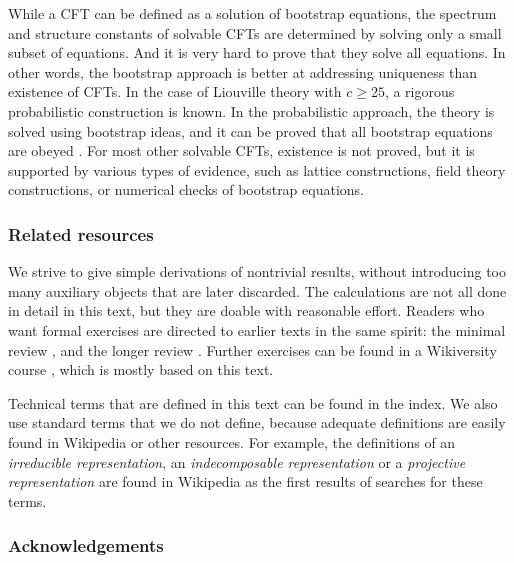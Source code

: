 \documentclass[12pt, a4paper]{article}
\begin{document}
While a CFT can be defined as a solution of bootstrap equations, the spectrum and structure constants of solvable CFTs are determined by solving only a small subset of equations. And it is very hard to prove that they solve all equations. In other words, the bootstrap approach is better at addressing uniqueness than existence of CFTs. In the case of Liouville theory with $c\geq 25$, a rigorous probabilistic construction is known. In the probabilistic approach, the theory is solved using bootstrap ideas, and it can be proved that all bootstrap equations are obeyed \cite{gkr24}. For most other solvable CFTs, existence is not proved, but it is supported by various types of evidence, such as lattice constructions, field theory constructions, or numerical checks of bootstrap equations.

\subsubsection*{Related resources}

We strive to give simple derivations of nontrivial results, without introducing too many auxiliary objects that are later discarded. The calculations are not all done in detail in this text, but they are doable with reasonable effort. Readers who want formal exercises are directed to earlier texts in the same spirit: the minimal review \cite{rib16}, and the longer review \cite{rib14}. Further exercises can be found in a Wikiversity course \cite{rib25}, which is mostly based on this text.

Technical terms that are defined in this text can be found in the index. We also use standard terms that we do not define, because adequate definitions are easily found in Wikipedia or other resources. For example, the definitions of an \textit{irreducible representation}, an \textit{indecomposable representation} or a \textit{projective representation} are found in Wikipedia as the first results of searches for these terms. 


\subsubsection*{Acknowledgements}
\end{document}
